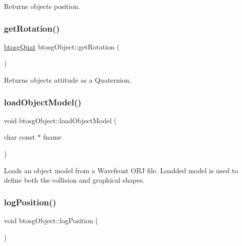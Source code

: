 Returns object\textquotesingle{}s position. \mbox{\label{classbtosgObject_a3b825999ad3a51bde743d4085ff19dae}} 
\subsubsection{\texorpdfstring{get\+Rotation()}{getRotation()}}
{\footnotesize\ttfamily \hyperlink{classbtosgQuat}{btosg\+Quat} btosg\+Object\+::get\+Rotation (\begin{DoxyParamCaption}{ }\end{DoxyParamCaption})\hspace{0.3cm}{\ttfamily [inline]}}

Returns object\textquotesingle{}s attitude as a Quaternion. \mbox{\label{classbtosgObject_a91838b8235579da178fcc06e6d3d47f3}} 
\subsubsection{\texorpdfstring{load\+Object\+Model()}{loadObjectModel()}}
{\footnotesize\ttfamily void btosg\+Object\+::load\+Object\+Model (\begin{DoxyParamCaption}\item[{char const $\ast$}]{fname }\end{DoxyParamCaption})}

Loads an object model from a Wavefront O\+BJ file. Loadded model is used to define both the collision and graphical shapes. \mbox{\label{classbtosgObject_acfd70fa6477c80fd7f29ad7ab9f4f067}} 
\subsubsection{\texorpdfstring{log\+Position()}{logPosition()}}
{\footnotesize\ttfamily void btosg\+Object\+::log\+Position (\begin{DoxyParamCaption}{ }\end{DoxyParamCaption})\hspace{0.3cm}{\ttfamily [inline]}}

